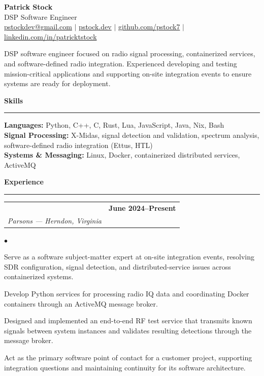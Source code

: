 \documentclass[10pt,letterpaper]{article}
\makeatletter
\newcommand{\sectiontitle}[1]{%
  \vspace{1.05em}%
  {\Large\bfseries\color{accent} #1}\par
  \vspace{0.25em}\hrule\vspace{0.5em}%
}
\newcommand{\entry}[4]{%
  \begin{tabularx}{\textwidth}{@{}>{\raggedright\arraybackslash}X>{\raggedleft\arraybackslash}p{2.05in}@{}}
    {\large\bfseries #1} & \textbf{#2} \\
    \textit{#3} & \textit{#4}
  \end{tabularx}\vspace{0.18em}%
}
\newenvironment{compactitems}{%
  \begin{list}{$\bullet$}{%
    \setlength{\leftmargin}{1.1em}%
    \setlength{\itemindent}{0pt}%
    \setlength{\itemsep}{0.2em}%
    \setlength{\parsep}{0pt}%
    \setlength{\topsep}{0.25em}%
  }%
}{\end{list}}
\makeatother
\begin{document}
\begin{center}
  {\Huge\bfseries Patrick Stock}\\[0.65em]
  {\Large\color{accent} DSP Software Engineer}\\[0.4em]
  \href{mailto:pstockdev@gmail.com}{pstockdev@gmail.com}
  \enspace$\vert$\enspace
  \href{https://pstock.dev}{pstock.dev}
  \enspace$\vert$\enspace
  \href{https://github.com/pstock7}{github.com/pstock7}
  \enspace$\vert$\enspace
  \href{https://www.linkedin.com/in/patricktstock/}{linkedin.com/in/patricktstock}
\end{center}

\vspace{0.55em}
DSP software engineer focused on radio signal processing, containerized services, and software-defined radio integration. Experienced developing and testing mission-critical applications and supporting on-site integration events to ensure systems are ready for deployment.

\sectiontitle{Skills}
\textbf{Languages:} Python, C++, C, Rust, Lua, JavaScript, Java, Nix, Bash\\
\textbf{Signal Processing:} X-Midas, signal detection and validation, spectrum analysis, software-defined radio integration (Ettus, HTL)\\
\textbf{Systems \& Messaging:} Linux, Docker, containerized distributed services, ActiveMQ

\sectiontitle{Experience}
\entry{DSP Software Engineer}{June 2024--Present}{Parsons --- Herndon, Virginia}{}
\begin{compactitems}
  \item Serve as a software subject-matter expert at on-site integration events, resolving SDR configuration, signal detection, and distributed-service issues across containerized systems.
  \item Develop Python services for processing radio IQ data and coordinating Docker containers through an ActiveMQ message broker.
  \item Designed and implemented an end-to-end RF test service that transmits known signals between system instances and validates resulting detections through the message broker.
  \item Act as the primary software point of contact for a customer project, supporting integration questions and maintaining continuity for its software architecture.
\end{compactitems}
\end{document}
